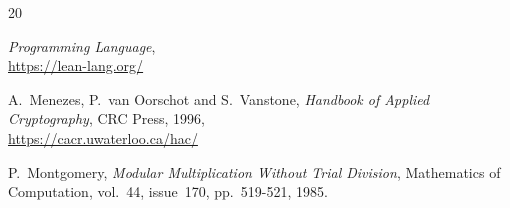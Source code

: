 \documentclass{llncs}
\newcommand{\GF}{GF}
\begin{document}
\begin{thebibliography}{20}




{} \emph{Programming Language},\\
\url{https://lean-lang.org/}




A.~Menezes, P.~van Oorschot and S.~Vanstone,
\emph{Handbook of Applied Cryptography},
CRC Press, 1996,\\
\url{https://cacr.uwaterloo.ca/hac/}

P.~Montgomery,
\emph{Modular Multiplication Without Trial Division},
Mathematics of Computation, vol.~44, issue~170, pp.~519-521, 1985.




\end{thebibliography}
\end{document}
